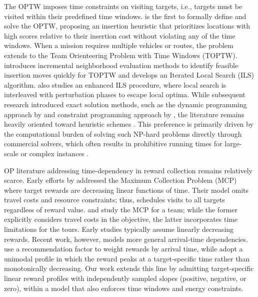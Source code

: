 \documentclass[11pt]{article}
\begin{document}
The OPTW imposes time constraints on visiting targets, i.e., targets must be visited within their predefined time windows. \citep{kantor1992} is the first to formally define and solve the OPTW, proposing an insertion heuristic that prioritizes locations with high scores relative to their insertion cost without violating any of the time windows. When a mission requires multiple vehicles or routes, the problem extends to the Team Orienteering Problem with Time Windows (TOPTW). \citep{vansteenwegen2009iterated} introduces incremental neighborhood evaluation methods to identify feasible insertion moves quickly for TOPTW and develops an Iterated Local Search (ILS) algorithm. \citep{gunawan2015iterated} also studies an enhanced ILS procedure, where local search is interleaved with perturbation phases to escape local optima. While subsequent research introduced exact solution methods, such as the dynamic programming approach by \citep{righini2009decremental} and constraint programming approach by \citep{gedik2017constraint}, the literature remains heavily oriented toward heuristic schemes \citep{gunawan2017well, hu2014iterative, labadie2012team, schmid2017effective}. This preference is primarily driven by the computational burden of solving such NP-hard problems directly through commercial solvers, which often results in prohibitive running times for large-scale or complex instances \citep{vansteenwegen2009iterated}.

OP literature addressing time-dependency in reward collection remains relatively scarce. Early efforts by \citep{erkut1996maximum} addressed the Maximum Collection Problem (MCP) where target rewards are decreasing linear functions of time. Their model omits travel costs and resource constraints; thus, schedules visits to all targets regardless of reward value. \citep{afsar2013team} and \citep{ekici2013multiple} study the MCP for a team; while the former explicitly considers travel costs in the objective, the latter incorporates time limitations for the tours. Early studies typically assume linearly decreasing rewards. Recent work, however, models more general arrival-time dependencies. \citep{vincent2019team} use a recommendation factor to weight rewards by arrival time, while \citep{peng2019agile, peng2020exact} adopt a unimodal profile in which the reward peaks at a target-specific time rather than monotonically decreasing. Our work extends this line by admitting target-specific linear reward profiles with independently sampled slopes (positive, negative, or zero), within a model that also enforces time windows and energy constraints.
\end{document}
